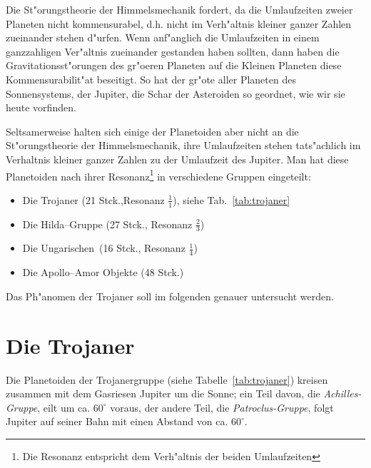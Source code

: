 Die St"orungstheorie der Himmelsmechanik fordert, da\3 die Umlaufzeiten zweier
Planeten nicht kommensurabel, d.h. nicht im Verh"altnis kleiner ganzer Zahlen
zueinander stehen d"ur\-fen. Wenn anf"anglich die Umlaufzeiten in einem ganzzahligen
Ver"altnis zueinander gestanden haben sollten, dann haben die Gravitationsst"orungen
des gr"o\3eren Planeten auf die Kleinen Planeten diese Kommensurabilit"at beseitigt.
So hat der gr"o\3te aller Planeten des Sonnensystems, der Jupiter, die Schar der
Asteroiden so geordnet, wie wir sie heute vorfinden. 

Seltsamerweise halten sich einige der Planetoiden aber nicht an die St"orungstheorie
der Himmelsmechanik, ihre Umlaufzeiten stehen tats"achlich im Verhaltnis kleiner
ganzer Zahlen zu der Umlaufzeit des Jupiter. Man hat diese Planetoiden nach ihrer
Resonanz\footnote{Die Resonanz entspricht dem Verh"altnis der beiden Umlaufzeiten} in
verschiedene Gruppen eingeteilt:   
\begin{itemize}
	\item{Die Trojaner (21 Stck.,Resonanz $\frac11$), siehe Tab.~\ref{tab:trojaner}}
	\item{Die Hilda--Gruppe (27 Stck., Resonanz $\frac23$)}
	\item{Die \glqq Ungarischen\grqq\ (16 Stck., Resonanz $\frac14$)}
	\item{Die Apollo--Amor Objekte (48 Stck.)}
\end{itemize}
Das Ph"anomen der Trojaner soll im folgenden genauer untersucht werden.

\section{Die Trojaner}
Die Planetoiden der Trojanergruppe (siehe Tabelle~\ref{tab:trojaner}) kreisen zusammen
mit dem Gasriesen Jupiter um die Sonne; ein Teil davon, die {\it Achilles-Gruppe},
eilt um ca. $60^\circ$ voraus, der andere Teil, die {\it Patroclus-Gruppe}, folgt
Jupiter auf seiner Bahn mit einen Abstand von ca. $60^\circ$.    

